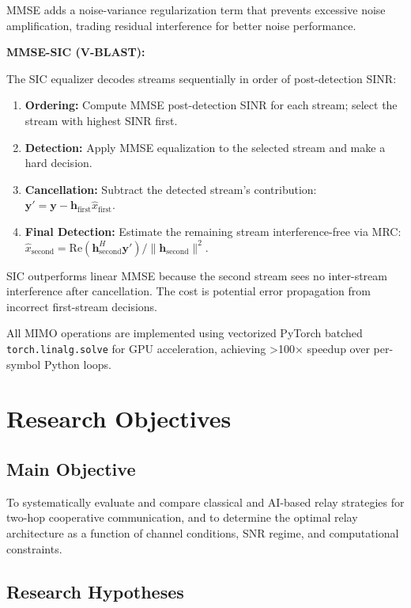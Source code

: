 \documentclass[
  english,
  12pt,
  12pt,
  a4paper,
  oneside]{report}
\providecommand{\tightlist}{%
  \setlength{\itemsep}{0pt}\setlength{\parskip}{0pt}}
\begin{document}
MMSE adds a noise-variance regularization term that prevents excessive noise amplification, trading residual interference for better noise performance.

\textbf{MMSE-SIC (V-BLAST):}

The SIC equalizer decodes streams sequentially in order of post-detection SINR:

\begin{enumerate}
\def\labelenumi{\arabic{enumi}.}
\tightlist
\item
  \textbf{Ordering:} Compute MMSE post-detection SINR for each stream; select the stream with highest SINR first.
\item
  \textbf{Detection:} Apply MMSE equalization to the selected stream and make a hard decision.
\item
  \textbf{Cancellation:} Subtract the detected stream's contribution: \(\mathbf{y}' = \mathbf{y} - \mathbf{h}_{\text{first}} \hat{x}_{\text{first}}\).
\item
  \textbf{Final Detection:} Estimate the remaining stream interference-free via MRC: \(\hat{x}_{\text{second}} = \text{Re}(\mathbf{h}_{\text{second}}^H \mathbf{y}') / \|\mathbf{h}_{\text{second}}\|^2\).
\end{enumerate}

SIC outperforms linear MMSE because the second stream sees no inter-stream interference after cancellation. The cost is potential error propagation from incorrect first-stream decisions.

All MIMO operations are implemented using vectorized PyTorch batched \texttt{torch.linalg.solve} for GPU acceleration, achieving \textgreater100× speedup over per-symbol Python loops.

\chapter{Research Objectives}\label{sec:research-objectives}

\section{Main Objective}\label{sec:main-objective}

To systematically evaluate and compare classical and AI-based relay strategies for two-hop cooperative communication, and to determine the optimal relay architecture as a function of channel conditions, SNR regime, and computational constraints.

\section{Research Hypotheses}\label{sec:research-hypotheses}
\end{document}
